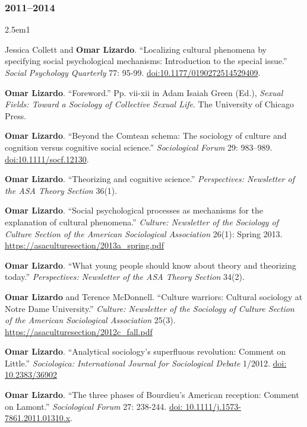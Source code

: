 \documentclass[
]{article}
\newenvironment{cventry}{\begin{hangparas}{2.5em}{1}}{\end{hangparas}}
\begin{document}
\subsubsection{2011--2014}\label{section-18}

\begin{cventry}

Jessica Collett and \textbf{Omar Lizardo}. ``Localizing cultural
phenomena by specifying social psychological mechanisms: Introduction to
the special issue.'' \emph{Social Psychology Quarterly} 77: 95-99.
\href{https://doi.org/10.1177/0190272514529409}{doi:10.1177/0190272514529409}.

\textbf{Omar Lizardo}. ``Foreword.'' Pp. vii-xii in Adam Isaiah Green
(Ed.), \emph{Sexual Fields: Toward a Sociology of Collective Sexual
Life}. The University of Chicago Press.

\textbf{Omar Lizardo}. ``Beyond the Comtean schema: The sociology of
culture and cognition versus cognitive social science.''
\emph{Sociological Forum} 29: 983--989.
\href{https://doi.org/10.1111/socf.12130}{doi:10.1111/socf.12130}.

\textbf{Omar Lizardo}. ``Theorizing and cognitive science.''
\emph{Perspectives: Newsletter of the ASA Theory Section} 36(1).

\textbf{Omar Lizardo}. ``Social psychological processes as mechanisms
for the explanation of cultural phenomena.'' \emph{Culture: Newsletter
of the Sociology of Culture Section of the American Sociological
Association} 26(1): Spring 2013.
\href{https://asaculturesection.files.wordpress.com/2018/03/2013a_spring.pdf}{https://asaculturesection/2013a\_spring.pdf}

\textbf{Omar Lizardo}. ``What young people should know about theory and
theorizing today.'' \emph{Perspectives: Newsletter of the ASA Theory
Section} 34(2).

\textbf{Omar Lizardo} and Terence McDonnell. ``Culture warriors:
Cultural sociology at Notre Dame University.'' \emph{Culture: Newsletter
of the Sociology of Culture Section of the American Sociological
Association} 25(3).
\href{https://asaculturesection.files.wordpress.com/2018/03/2012c_fall.pdf}{https://asaculturesection/2012c\_fall.pdf}

\textbf{Omar Lizardo}. ``Analytical sociology's superfluous revolution:
Comment on Little.'' \emph{Sociologica: International Journal for
Sociological Debate} 1/2012.
\href{https://www.rivisteweb.it/doi/10.2383/36902}{doi: 10.2383/36902}

\textbf{Omar Lizardo}. ``The three phases of Bourdieu's American
reception: Comment on Lamont.'' \emph{Sociological Forum} 27: 238-244.
\href{https://doi.org/10.1111/j.1573-7861.2011.01310.x}{doi:
10.1111/j.1573-7861.2011.01310.x}.

\end{cventry}
\end{document}
